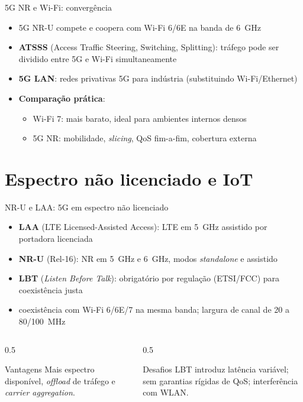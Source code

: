\documentclass[aspectratio=169,11pt]{beamer}
\begin{document}
\begin{frame}{5G NR e Wi-Fi: convergência}
  \begin{itemize}
    \item 5G NR-U compete e coopera com Wi-Fi 6/6E na banda de 6~GHz
    \item \textbf{ATSSS} (Access Traffic Steering, Switching, Splitting): tráfego pode ser dividido entre 5G e Wi-Fi simultaneamente
    \item \textbf{5G LAN}: redes privativas 5G para indústria (substituindo Wi-Fi/Ethernet)
    \item \textbf{Comparação prática}:
      \begin{itemize}
        \item Wi-Fi 7: mais barato, ideal para ambientes internos densos
        \item 5G NR: mobilidade, \emph{slicing}, QoS fim-a-fim, cobertura externa
      \end{itemize}
  \end{itemize}
\end{frame}

\section{Espectro não licenciado e IoT}

\begin{frame}{NR-U e LAA: 5G em espectro não licenciado}
  \begin{itemize}
    \item \textbf{LAA} (LTE Licensed-Assisted Access): LTE em 5~GHz assistido por portadora licenciada
    \item \textbf{NR-U} (Rel-16): NR em 5~GHz e 6~GHz, modos \emph{standalone} e assistido
    \item \textbf{LBT} (\emph{Listen Before Talk}): obrigatório por regulação (ETSI/FCC) para coexistência justa
    \item coexistência com Wi-Fi 6/6E/7 na mesma banda; largura de canal de 20 a 80/100~MHz
  \end{itemize}
  \begin{columns}
    \begin{column}{0.5\textwidth}
      \begin{block}{Vantagens}
        Mais espectro disponível, \emph{offload} de tráfego e \emph{carrier aggregation}.
      \end{block}
    \end{column}
    \begin{column}{0.5\textwidth}
      \begin{alertblock}{Desafios}
        LBT introduz latência variável; sem garantias rígidas de QoS; interferência com WLAN.
      \end{alertblock}
    \end{column}
  \end{columns}
\end{frame}
\end{document}
